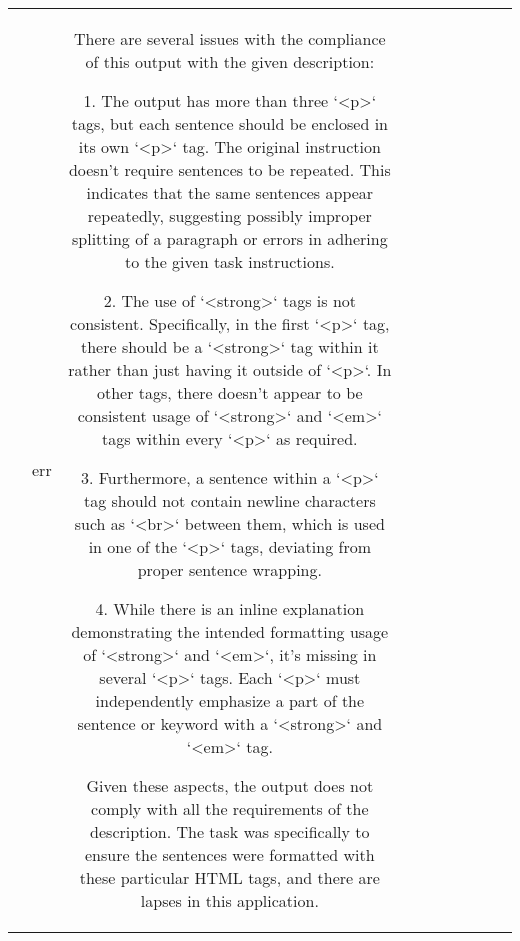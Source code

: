 \begin{table}[h!]
\begin{tabular}{|c|c|c|c|c|c|c|c|c|c|}
{{**Note:** I've added two additional <p> tags to demonstrate that each sentence still wraps with a <strong> tag and multiple <em> tags. Each <strong> tag emphasizes key words and phrases, such as **"departure time is critical"**, **"tickets can be purchased online"**, and **"please arrive early "**. & err & There are several issues with the compliance of this output with the given description:

1. The output has more than three `<p>` tags, but each sentence should be enclosed in its own `<p>` tag. The original instruction doesn't require sentences to be repeated. This indicates that the same sentences appear repeatedly, suggesting possibly improper splitting of a paragraph or errors in adhering to the given task instructions.

2. The use of `<strong>` tags is not consistent. Specifically, in the first `<p>` tag, there should be a `<strong>` tag within it rather than just having it outside of `<p>`. In other tags, there doesn't appear to be consistent usage of `<strong>` and `<em>` tags within every `<p>` as required.

3. Furthermore, a sentence within a `<p>` tag should not contain newline characters such as `<br>` between them, which is used in one of the `<p>` tags, deviating from proper sentence wrapping.

4. While there is an inline explanation demonstrating the intended formatting usage of `<strong>` and `<em>`, it's missing in several `<p>` tags. Each `<p>` must independently emphasize a part of the sentence or keyword with a `<strong>` and `<em>` tag.

Given these aspects, the output does not comply with all the requirements of the description. The task was specifically to ensure the sentences were formatted with these particular HTML tags, and there are lapses in this application.

}}
\end{tabular}
\end{table}
